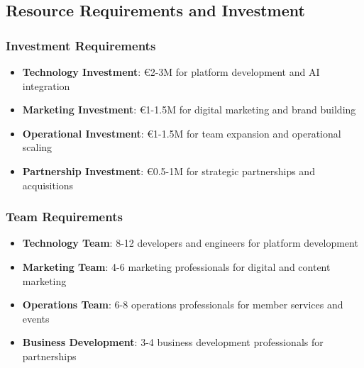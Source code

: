 \subsection{Resource Requirements and Investment}

\subsubsection{Investment Requirements}
\begin{itemize}
    \item \textbf{Technology Investment}: €2-3M for platform development and AI integration
    \item \textbf{Marketing Investment}: €1-1.5M for digital marketing and brand building
    \item \textbf{Operational Investment}: €1-1.5M for team expansion and operational scaling
    \item \textbf{Partnership Investment}: €0.5-1M for strategic partnerships and acquisitions
\end{itemize}

\subsubsection{Team Requirements}
\begin{itemize}
    \item \textbf{Technology Team}: 8-12 developers and engineers for platform development
    \item \textbf{Marketing Team}: 4-6 marketing professionals for digital and content marketing
    \item \textbf{Operations Team}: 6-8 operations professionals for member services and events
    \item \textbf{Business Development}: 3-4 business development professionals for partnerships
\end{itemize}

